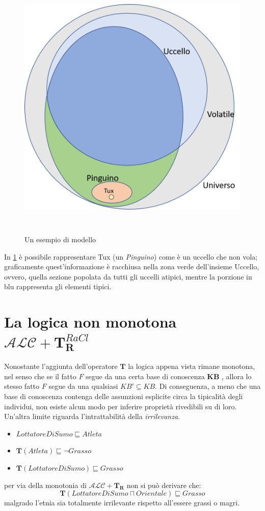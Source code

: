 \begin{figure}[h]
	\caption{Un esempio di modello}
	\label{fig:esempioM}
	\includegraphics[height=13cm,width=\textwidth]{immagini/ModelloALC_T.png}
	\centering
\end{figure} %
In \ref{fig:esempioM} è possibile rappresentare Tux (un \textit{Pinguino}) come è un uccello che non vola;
graficamente quest'informazione è racchiusa nella zona verde dell'insieme Uccello,
ovvero, quella sezione popolata da tutti gli uccelli atipici, mentre la porzione in blu rappresenta gli elementi tipici.

\section{La logica non monotona $ \mathcal{ALC} + \mathbf{T}_{\mathbf{R}}^{\mathit{RaCl}} $}
Nonostante l'aggiunta dell'operatore $ \mathbf{T} $ la logica appena vista rimane monotona, 
nel senso che se il fatto $ F $ segue da una certa base
di conoscenza \textbf{KB} , allora lo stesso fatto $ F $ segue da una qualsiasi $ KB' \subseteq KB $. 
Di conseguenza, a meno che una base di conoscenza contenga delle assunzioni esplicite circa la tipicalità degli individui, non esiste alcun modo per inferire proprietà rivedibili su di loro. \\
Un'altra limite riguarda l'intrattabilità della \textit{irrilevanza}.
\begin{itemize}
	\item[] $ LottatoreDiSumo \sqsubseteq Atleta $
	\item[] $ \mathbf{T}(Atleta) \sqsubseteq \neg Grasso $
	\item[] $ \mathbf{T}(LottatoreDiSumo) \sqsubseteq Grasso $
\end{itemize}
per via della monotonia di $ \mathcal{ALC + \mathbf{T_{R}}} $ non si può derivare che:
\[ \mathbf{T}(LottatoreDiSumo \sqcap Orientale) \sqsubseteq Grasso \] 
malgrado l'etnia sia totalmente irrilevante rispetto all'essere grassi o magri.


